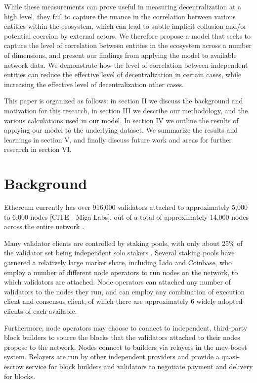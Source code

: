 \documentclass[conference]{IEEEtran}
\begin{document}
While these measurements can prove useful in measuring decentralization at a high level, they fail to capture the nuance in the correlation between various entities within the ecosystem, which can lead to subtle implicit collusion and/or potential coercion by external actors.  We therefore propose a model that seeks to capture the level of correlation between entities in the ecosystem across a number of dimensions, and present our findings from applying the model to available network data.  We demonstrate how the level of correlation between independent entities can reduce the effective level of decentralization in certain cases, while increasing the effective level of decentralization other cases.

This paper is organized as follows: in section II we discuss the background and motivation for this research, in section III we describe our methodology, and the various calculations used in our model.  In section IV we outline the results of applying our model to the underlying dataset.  We summarize the results and learnings in section V, and finally discuss future work and areas for further research in section VI.

\section{Background}

Ethereum currently has over 916,000 validators \cite{beaconchain2024} attached to approximately 5,000 to 6,000 nodes [CITE - Miga Labs], out of a total of approximately 14,000 nodes across the entire network \cite{nodewatch2024}.

Many validator clients are controlled by staking pools, with only about 25\% of the validator set being independent solo stakers \cite{dune2024}.  Several staking pools have garnered a relatively large market share, including Lido and Coinbase, who employ a number of different node operators to run nodes on the network, to which validators are attached.  Node operators can attached any number of validators to the nodes they run, and can employ any combination of execution client and consensus client, of which there are approximately 6 widely adopted clients of each available.

Furthermore, node operators may choose to connect to independent, third-party block builders to source the blocks that the validators attached to their nodes propose to the network. Nodes connect to builders via relayers in the mev-boost system.  Relayers are run by other independent providers and provide a quasi-escrow service for block builders and validators to negotiate payment and delivery for blocks.
\end{document}
